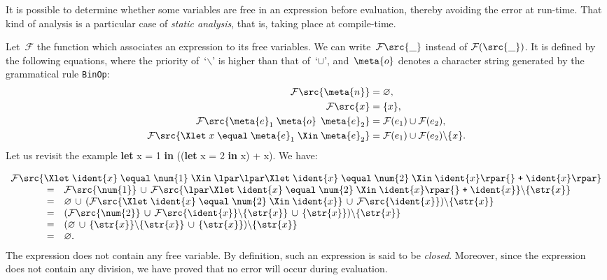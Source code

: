 It is possible to determine whether some variables are free in an
expression before evaluation, thereby avoiding the error 
at run\hyp{}time. That kind of analysis is a particular case of
\emph{static analysis}, that is, taking place at compile\hyp{}time.

Let~$\mathcal{F}$ the function which associates an expression to its
free variables. We can write~$\mathcal{F} \src{\_}$ instead of
$\mathcal{F}(\src{\_})$. It is defined by the following equations,
where the priority of~`$\backslash$' is higher than that of~`$\cup$',
and~$\meta{o}$ denotes a character string generated by the grammatical
rule \texttt{BinOp}:
\begin{align*}
\mathcal{F} \src{\meta{n}} & = \varnothing,\\
\mathcal{F} \src{x} & = \{x\},\\
\mathcal{F} \src{\meta{e}_1 \; \meta{o} \;\, \meta{e}_2} & = \mathcal{F}(e_1) \cup \mathcal{F}(e_2),\\
\mathcal{F} \src{\Xlet \; x \; \equal \; \meta{e}_1 \; \Xin \;
  \meta{e}_2} & = \mathcal{F}(e_1) \cup \mathcal{F}(e_2) \backslash \{x\}.
\end{align*}
Let us revisit the example \textsf{\textbf{let} x = 1 \textbf{in}
  ((\textbf{let} x = 2 \textbf{in} x) + x)}. We have:

\begin{equation*}
\begin{array}{lcl}
\multicolumn{3}{l}{
\mathcal{F} \src{\Xlet \; \ident{x} \; \equal \; \num{1} \; \Xin \;
  \lpar\lpar\Xlet \; \ident{x} \; \equal \; \num{2} \; \Xin \;
  \ident{x}\rpar{} \; \texttt{+} \; \ident{x}\rpar}}\\
\phantom{XXX}
 &=& \mathcal{F} \src{\num{1}} \, \cup \, \mathcal{F} \src{\lpar\Xlet \; \ident{x} \;
     \equal \; \num{2} \; \Xin \; \ident{x}\rpar{} \; \texttt{+}
    \; \ident{x}} \backslash \{\str{x}\}\\
 &=& \varnothing \, \cup \,
     (\mathcal{F} \src{\Xlet \; \ident{x} \; \equal \; \num{2} \;
     \Xin \; \ident{x}} \, \cup \, \mathcal{F} \src{\ident{x}})
     \backslash \{\str{x}\} \\
 &=& (\mathcal{F} \src{\num{2}} \, \cup \, \mathcal{F} \src{\ident{x}} \backslash
      \{\str{x}\} \, \cup \, \{\str{x}\}) \backslash \{\str{x}\}\\
 &=& (\varnothing \, \cup \, \{\str{x}\} \backslash \{\str{x}\}
     \, \cup \, \{\str{x}\}) \backslash \{\str{x}\}\\
 &=& \varnothing.
\end{array}
\end{equation*}
The expression does not contain any free variable. By definition, such
an expression is said to be \emph{closed}. Moreover, since the
expression does not contain any division, we have proved that
no error will occur during evaluation.

